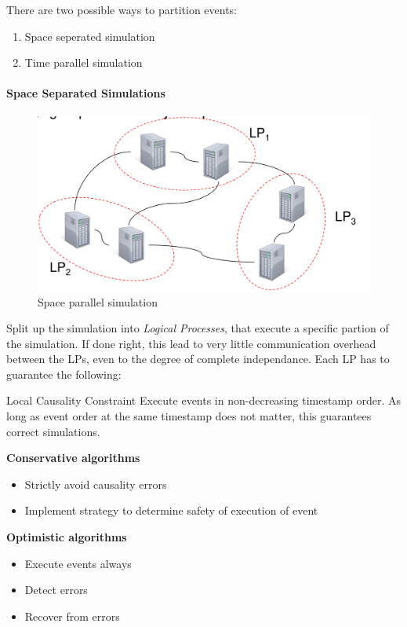 \documentclass[english]{panikzettel}
\begin{document}
	There are two possible ways to partition events:
	\begin{enumerate}
		\item Space seperated simulation
		\item 	Time parallel simulation
	\end{enumerate}

	\paragraph{Space Separated Simulations}
	\label{pgf:parallel-des:space-separated-simulations}
	
	\begin{figure}[H]
		\centering
		\includegraphics[width=\textwidth]{img/5-space-parallel.png}
		\caption{Space parallel simulation}
		\label{img-5-space-parallel}
	\end{figure}
	
	Split up the simulation into \textit{Logical Processes}, that execute a specific partion of the simulation. 
	If done right, this lead to very little communication overhead between the LPs, even to the degree of complete independance.
	Each LP has to guarantee the following:

	\begin{defi}{Local Causality Constraint}
		Execute events in non-decreasing timestamp order.
		\tcblower
		As long as event order at the same timestamp does not matter, this guarantees correct simulations.
	\end{defi}
	
	\begin{halfboxl}
		\textbf{Conservative algorithms}
		\begin{itemize}
			\item Strictly avoid causality errors
			\item Implement strategy to determine safety of execution of event
		\end{itemize}
	\end{halfboxl}%
	\begin{halfboxr}
		\vspace{-\baselineskip}
		\textbf{Optimistic algorithms}
		\begin{itemize}
			\item Execute events always
			\item Detect errors
			\item Recover from errors
		\end{itemize}
	\end{halfboxr}
\end{document}
